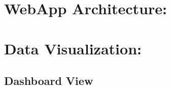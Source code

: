



\hypertarget{webapp-architecture}{%
\section{WebApp Architecture:}
\label{webapp-architecture}}


\hypertarget{data-visualization}{%
\section{Data Visualization:}
\label{data-visualization}}


\hypertarget{dashboard-view}{%
\subsection{Dashboard View}
\label{dashboard-view}}